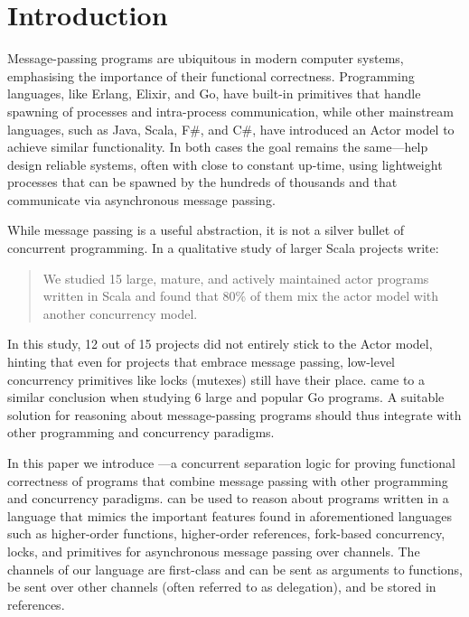 \section{Introduction}
\label{sec:intro}

Message-passing programs are ubiquitous in modern computer systems,
emphasising the importance of their functional correctness.
Programming languages, like Erlang, Elixir, and Go, have built-in
primitives that handle spawning of processes and intra-process
communication, while other mainstream languages, such as Java,
Scala, F\#, and C\#, have introduced an Actor model
\cite{hewitt_IJCAI1973} to achieve similar
functionality. In both cases the goal remains the same---help design
reliable systems, often with close to constant up-time, using
lightweight processes that can be spawned by the hundreds of
thousands and that communicate via asynchronous message passing.

While message passing is a useful abstraction, it is not
a silver bullet of concurrent programming. In a qualitative study of
larger Scala projects \citet{tasharofi-ECOOP2013} write:

\begin{quote}
  We studied 15 large, mature, and actively maintained actor programs
  written in Scala and found that 80\% of them mix the actor model
  with another concurrency model.
\end{quote}

\noindent In this study, 12 out of 15 projects did not entirely stick to the Actor
model, hinting that even for projects that embrace message passing,
low-level concurrency primitives like locks (\ie mutexes) still have
their place.
\citet{tu-ASPLOS2019} came to a similar conclusion when studying 6 large and
popular Go programs.
A suitable solution for reasoning about message-passing
programs should thus integrate with other programming and concurrency paradigms.

In this paper we introduce \textbf{\lname}---a concurrent separation logic for
proving functional correctness of programs that combine message passing with
other programming and concurrency paradigms.
\lname can be used to reason about programs written in a language that mimics the
important features found in aforementioned languages such as higher-order functions,
higher-order references, fork-based concurrency, locks, and primitives for
asynchronous message passing over channels.
The channels of our language are first-class and can be
sent as arguments to functions, be sent over other channels
(often referred to as delegation), and be stored in references.


